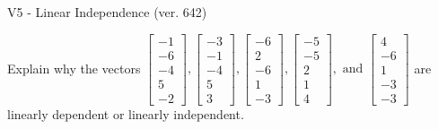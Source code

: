 \begin{exercise}
  \begin{exerciseTitle}V5 - Linear Independence (ver. 642)\end{exerciseTitle}
  \begin{exerciseStatement}
    Explain why the vectors \(\left[\begin{array}{r}
-1 \\
-6 \\
-4 \\
5 \\
-2
\end{array}\right] , \left[\begin{array}{r}
-3 \\
-1 \\
-4 \\
5 \\
3
\end{array}\right] , \left[\begin{array}{r}
-6 \\
2 \\
-6 \\
1 \\
-3
\end{array}\right] , \left[\begin{array}{r}
-5 \\
-5 \\
2 \\
1 \\
4
\end{array}\right] , \text{ and } \left[\begin{array}{r}
4 \\
-6 \\
1 \\
-3 \\
-3
\end{array}\right]\) are linearly dependent or linearly independent.	



\end{exerciseStatement}
\end{exercise}
